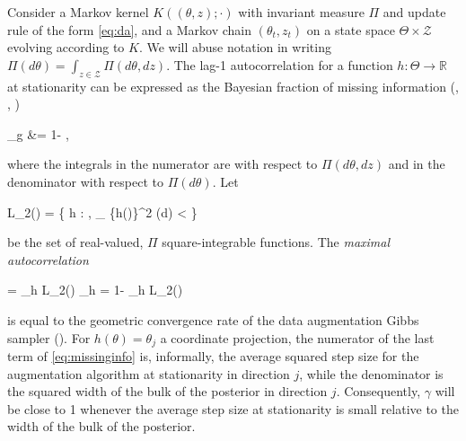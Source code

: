 \documentclass[twoside,11pt]{article}
\newcommand{\be}{\begin{equs}}
\newcommand{\ee}{\end{equs}}
\newcommand{\bb}[1]{\mathbb{#1}}
\newcommand{\mc}[1]{\mathcal{#1}}
\newcommand{\var}{\text{var}}
\newcommand{\1}{\mathbf 1}
\begin{document}
Consider a Markov kernel $K((\theta,z);\cdot)$ with invariant measure $\Pi$ and update rule of the form \eqref{eq:da}, and a Markov chain $(\theta_t,z_t)$ on a state space $\Theta \times \mc Z$ evolving according to $K$. We will abuse notation in writing $\Pi(d\theta) = \int_{z \in \mc Z} \Pi(d\theta,dz)$. The lag-1 autocorrelation for a function $h : \Theta \to \bb R$ at stationarity can be expressed as the Bayesian fraction of missing information (\cite{papaspiliopoulos2007general}, \cite{rubin2004multiple}, \cite{liu1994fraction})
\be
\gamma_g &= 1- \frac{\bb E[\var(h(\theta) \mid z)]}{\var(h(\theta))}, \label{eq:missinginfo}
\ee
where the integrals in the numerator are with respect to $\Pi(d\theta,dz)$ and in the denominator with respect to $\Pi(d\theta)$. Let 
\be
L_2(\Pi) = \left\{ h : \Theta \to \bb R, \int_{\theta \in \Theta} \{h(\theta)\}^2 \Pi(d\theta) < \infty \right\} 
\ee
be the set of real-valued, $\Pi$ square-integrable functions. The \emph{maximal autocorrelation}
\be
\gamma = \sup_{h \in L_2(\Pi)} \gamma_h = 1- \inf_{h \in L_2(\Pi)} \frac{\bb E[\var(h(\theta) \mid z)]}{\var(h(\theta))}
\ee
is equal to the geometric convergence rate of the data augmentation Gibbs sampler (\cite{liu1994fraction}). For $h(\theta) = \theta_j$ a coordinate projection, the numerator of the last term of \eqref{eq:missinginfo} is, informally, the average squared step size for the augmentation algorithm at stationarity in direction $j$, while the denominator is the squared width of the bulk of the posterior in direction $j$. Consequently, $\gamma$ will be close to 1 whenever the average step size at stationarity is small relative to the width of the bulk of the posterior. 
\end{document}

